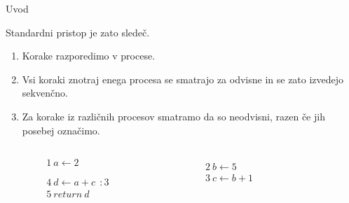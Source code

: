 \documentclass{beamer}
\theoremstyle{definition} %
\theoremstyle{plain} %
\begin{document}
	\begin{frame}[fragile]{Uvod}
		
		Standardni pristop je zato sledeč.
		\begin{enumerate}
			\item Korake razporedimo v procese.
			\item Vsi koraki znotraj enega procesa se smatrajo za odvisne in se zato izvedejo sekvenčno.
			\item Za korake iz različnih procesov smatramo da so neodvisni, razen če jih posebej označimo.
		\end{enumerate}
	
		\begin{columns}[T]
			\begin{column}{0.15\textwidth}
				\begin{align*}
				&1\ a \gets 2  \\
				& \\
				& \\
				&4\ d \gets a + c\ \ : 3 \\
				&5\ return\ d 
				\end{align*}
				\vspace{0.1ex}
			\end{column}
			\begin{column}{0.15\textwidth}
				\begin{align*}
				& &  \\
				&               &2\ b \gets 5 \\
				&               &3\ c \gets b + 1 \\
				&& \\
				&&\\
				\end{align*}
			\end{column}
			\begin{column}{0.05\textwidth}
			\end{column}
		\end{columns}
	
		
	\end{frame}
\end{document}
